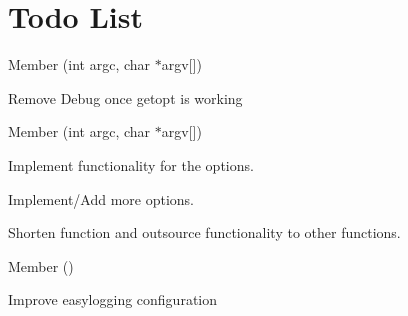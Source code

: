 \chapter{Todo List}
\hypertarget{todo}{}\label{todo}

\begin{DoxyRefList}
\item[Member \doxylink{main_8cpp_a2b2d4ce8b34d14b9e775eaf6214b00e1}{main} (int argc, char \texorpdfstring{$\ast$}{*}argv\mbox{[}\mbox{]})]\label{todo__todo000001}%
%

\begin{DoxyItemize}
\item Remove Debug once getopt is working 
\end{DoxyItemize}
\item[Member \doxylink{classutils_1_1StartupHandler_a9cdd57841cee245c1a1c94b0efe6549c}{utils\+::Startup\+Handler\+::get\+Options} (int argc, char \texorpdfstring{$\ast$}{*}argv\mbox{[}\mbox{]})]\label{todo__todo000003}%
%

\begin{DoxyItemize}
\item Implement functionality for the options.
\item Implement/\+Add more options.
\item Shorten function and outsource functionality to other functions. 
\end{DoxyItemize}
\item[Member \doxylink{classutils_1_1StartupHandler_ade70b280d4385f270829b177da44b169}{utils\+::Startup\+Handler\+::init\+Easy\+Logging} ()]\label{todo__todo000002}%
%

\begin{DoxyItemize}
\item Improve easylogging configuration 
\end{DoxyItemize}
\end{DoxyRefList}